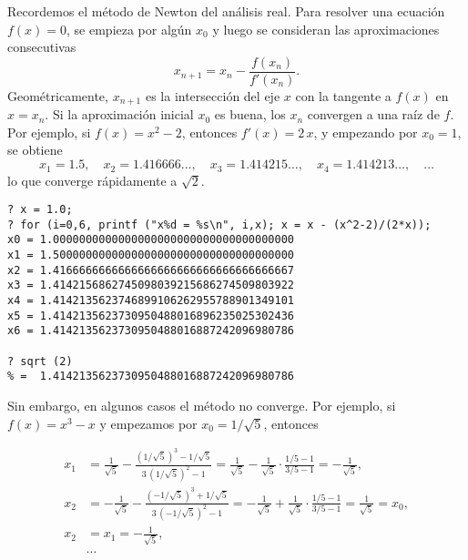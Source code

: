 \documentclass{article}
\numberwithin{equation}{section}
\theoremstyle{definition}
\begin{document}
\begin{ejemplo}
  Recordemos el método de Newton del análisis real. Para resolver una ecuación
  $f (x) = 0$, se empieza por algún $x_0$ y luego se consideran las
  aproximaciones consecutivas
  $$x_{n+1} = x_n - \frac{f (x_n)}{f' (x_n)}.$$
  Geométricamente, $x_{n+1}$ es la intersección del eje $x$ con la tangente
  a $f (x)$ en $x = x_n$. Si la aproximación inicial $x_0$ es buena, los $x_n$
  convergen a una raíz de $f$. Por ejemplo, si $f (x) = x^2 - 2$, entonces
  $f' (x) = 2\,x$, y empezando por $x_0 = 1$, se obtiene
  \[ x_1 = 1.5, \quad
     x_2 = 1.416666\ldots, \quad
     x_3 = 1.414215\ldots, \quad
     x_4 = 1.414213\ldots, \quad
     \ldots \]
  lo que converge rápidamente a $\sqrt{2}$.

  \begin{framed}\small
\begin{verbatim}
? x = 1.0;
? for (i=0,6, printf ("x%d = %s\n", i,x); x = x - (x^2-2)/(2*x));
x0 = 1.0000000000000000000000000000000000000
x1 = 1.5000000000000000000000000000000000000
x2 = 1.4166666666666666666666666666666666667
x3 = 1.4142156862745098039215686274509803922
x4 = 1.4142135623746899106262955788901349101
x5 = 1.4142135623730950488016896235025302436
x6 = 1.4142135623730950488016887242096980786

? sqrt (2)                                                       
% =  1.4142135623730950488016887242096980786
\end{verbatim}
  \end{framed}

  Sin embargo, en algunos casos el método no converge. Por ejemplo,
  si $f (x) = x^3 - x$ y empezamos por $x_0 = 1/\sqrt{5}$, entonces

  \begin{align*}
    x_1 & = \frac{1}{\sqrt{5}} - \frac{(1/\sqrt{5})^3 - 1/\sqrt{5}}{3\,(1/\sqrt{5})^2 - 1} =
          \frac{1}{\sqrt{5}} - \frac{1}{\sqrt{5}}\cdot \frac{1/5 - 1}{3/5 - 1} =
          -\frac{1}{\sqrt{5}},\\
    x_2 & = -\frac{1}{\sqrt{5}} - \frac{(-1/\sqrt{5})^3 + 1/\sqrt{5}}{3\,(-1/\sqrt{5})^2 - 1} =
          -\frac{1}{\sqrt{5}} + \frac{1}{\sqrt{5}}\cdot \frac{1/5 - 1}{3/5 - 1} =
          \frac{1}{\sqrt{5}} = x_0,\\
    x_2 & = x_1 = -\frac{1}{\sqrt{5}},\\
        & \cdots
  \end{align*}

  \begin{center}
\end{center}
\end{ejemplo}
\end{document}
